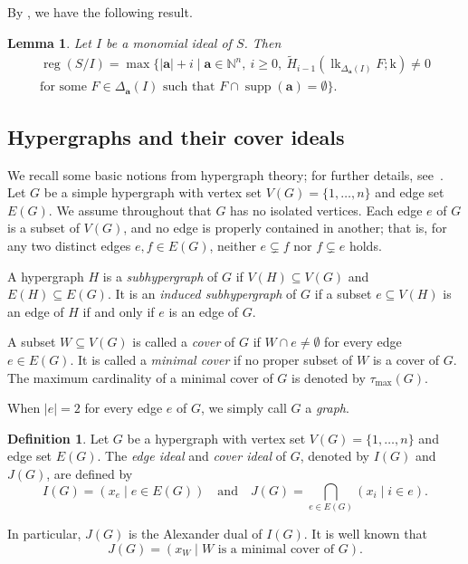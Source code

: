 \documentclass[12pt,amscd]{amsart}
\newtheorem{lem}[thm]{Lemma}
\theoremstyle{definition}
\newtheorem{defn}[thm]{Definition}
\DeclareMathOperator{\supp}{supp}
\DeclareMathOperator{\lk}{lk}
\DeclareMathOperator{\reg}{reg}
\def\a {\mathbf a}
\def\k {\mathrm k}
\def\NN {\mathbb{N}}
\begin{document}
By \cite[Lemmas 2.12 and 2.19]{MNPTV}, we have the following result.

\begin{lem}\label{Key0}
Let $I$ be a monomial ideal of $S$. Then
\begin{multline*}
\reg(S/I)
=
\max \bigl\{
|\a| + i
\;\big|\;
\a \in \NN^n,\ i \ge 0,\ 
\widetilde{H}_{i-1}(\lk_{\Delta_{\a}(I)} F; \k) \neq 0 \\
\text{for some } F \in \Delta_{\a}(I)
\text{ such that }
F \cap \supp(\a) = \emptyset
\bigr\}.
\end{multline*}
\end{lem}


\subsection{Hypergraphs and their cover ideals}
We recall some basic notions from hypergraph theory; for further details, see~\cite{BM}. Let $G$ be a simple hypergraph with vertex set $V(G) = \{1, \ldots, n\}$ and edge set $E(G)$. We assume throughout that $G$ has no isolated vertices. Each edge $e$ of $G$ is a subset of $V(G)$, and no edge is properly contained in another; that is, for any two distinct edges $e, f \in E(G)$, neither $e \subsetneq f$ nor $f \subsetneq e$ holds.

A hypergraph $H$ is a \emph{subhypergraph} of $G$ if $V(H) \subseteq V(G)$ and $E(H) \subseteq E(G)$. It is an \emph{induced subhypergraph} of $G$ if a subset $e \subseteq V(H)$ is an edge of $H$ if and only if $e$ is an edge of $G$.

A subset $W \subseteq V(G)$ is called a \emph{cover} of $G$ if $W \cap e \neq \emptyset$ for every edge $e \in E(G)$. It is called a \emph{minimal cover} if no proper subset of $W$ is a cover of $G$. The maximum cardinality of a minimal cover of $G$ is denoted by $\tau_{\max}(G)$.

When $|e| = 2$ for every edge $e$ of $G$, we simply call $G$ a \emph{graph}.

\begin{defn}
Let $G$ be a hypergraph with vertex set $V(G) = \{1, \ldots, n\}$ and edge set $E(G)$. The \emph{edge ideal} and \emph{cover ideal} of $G$, denoted by $I(G)$ and $J(G)$, are defined by
\[
I(G) = (x_e \mid e \in E(G))
\quad \text{and} \quad
J(G) = \bigcap_{e \in E(G)} (x_i \mid i \in e).
\]
\end{defn}

In particular, $J(G)$ is the Alexander dual of $I(G)$. It is well known that
\[
J(G) = (x_W \mid W \text{ is a minimal cover of } G).
\]
\end{document}
